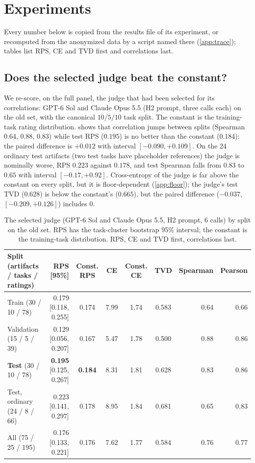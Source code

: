 \section{Experiments}
\label{sec:experiments}
Every number below is copied from the results file of its experiment, or recomputed from the anonymized data by a script named there (\cref{app:trace}); tables list RPS, CE and TVD first and correlations last.

\subsection{Does the selected judge beat the constant?}
\label{sec:exp22}
We re-score, on the full panel, the judge that had been selected for its correlations: GPT-6 Sol and Claude Opus 5.5 (H2 prompt, three calls each) on the old set, with the canonical $10/5/10$ task split.
The constant is the training-task rating distribution.
 shows that correlation jumps between splits (Spearman $0.64$, $0.88$, $0.83$) while test RPS ($0.195$) is no better than the constant ($0.184$): the paired difference is $+0.012$ with interval $[-0.090,+0.109]$.
On the 24 ordinary test artifacts (two test tasks have placeholder references) the judge is nominally worse, RPS $0.223$ against $0.178$, and test Spearman falls from $0.83$ to $0.65$ with interval $[-0.17,+0.92]$.
Cross-entropy of the judge is far above the constant on every split, but it is floor-dependent (\cref{app:floor}); the judge's test TVD ($0.628$) is below the constant's ($0.665$), but the paired difference ($-0.037$, $[-0.209,+0.126]$) includes $0$.

\begin{table}[t]
\caption{The selected judge (GPT-6 Sol and Claude Opus 5.5, H2 prompt, 6 calls) by split on the old set. RPS has the task-cluster bootstrap 95\% interval; the constant is the training-task distribution. RPS, CE and TVD first, correlations last.}
\label{tab:exp22}
\centering\small
\begin{tabular}{lrccccrr}
\toprule
Split (artifacts / tasks / ratings) & RPS [95\%] & Const. RPS & CE & Const. CE & TVD & Spearman & Pearson\\
\midrule
Train (30 / 10 / 78) & 0.179 [0.118, 0.255] & 0.174 & 7.99 & 1.74 & 0.583 & 0.64 & 0.66\\
Validation (15 / 5 / 39) & 0.129 [0.056, 0.207] & 0.167 & 5.47 & 1.78 & 0.500 & 0.88 & 0.86\\
\textbf{Test} (30 / 10 / 78) & \textbf{0.195} [0.125, 0.267] & \textbf{0.184} & 8.31 & 1.81 & 0.628 & 0.83 & 0.86\\
Test, ordinary (24 / 8 / 66) & 0.223 [0.141, 0.297] & 0.178 & 8.95 & 1.84 & 0.681 & 0.65 & 0.83\\
All (75 / 25 / 195) & 0.176 [0.133, 0.221] & 0.176 & 7.62 & 1.77 & 0.584 & 0.76 & 0.77\\
\bottomrule
\end{tabular}
\end{table}

